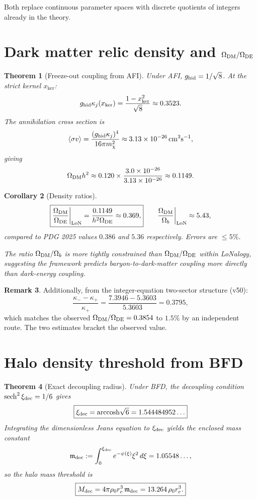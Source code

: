\documentclass[12pt]{article}
\theoremstyle{plain}
\newtheorem{theorem}{Theorem}[section]
\newtheorem{corollary}[theorem]{Corollary}
\theoremstyle{definition}
\newtheorem{remark}[theorem]{Remark}
\numberwithin{equation}{section}
\newcommand{\kker}{\mathrm{ker}}
\DeclareMathOperator{\sech}{sech}
\begin{document}
Both replace continuous parameter spaces with discrete quotients of integers already in the theory.

\section{Dark matter relic density and \texorpdfstring{$\Omega_{\rm DM}/\Omega_{\rm DE}$}{Omega DM/DE}}\label{sec:omega}

\begin{theorem}[Freeze-out coupling from AFI]\label{thm:ghid}
Under AFI, $g_{\rm hid} = 1/\sqrt{8}$.  At the strict kernel $x_\kker$:
\[
g_{\rm hid}\kappa_j(x_\kker) = \frac{1-x_\kker^2}{\sqrt{8}} \approx 0.3523.
\]
The annihilation cross section is
\[
\langle\sigma v\rangle = \frac{(g_{\rm hid}\kappa_j)^4}{16\pi m_\chi^2}
\approx 3.13\times10^{-26}\,\mathrm{cm}^3\mathrm{s}^{-1},
\]
giving
\[
\Omega_{\rm DM}h^2 \approx 0.120\times\frac{3.0\times10^{-26}}{3.13\times10^{-26}} \approx 0.1149.
\]
\end{theorem}

\begin{corollary}[Density ratios]
\[
\boxed{\frac{\Omega_{\rm DM}}{\Omega_{\rm DE}}\bigg|_{\rm LoN}
= \frac{0.1149}{h^2\Omega_{\rm DE}} \approx 0.369,}
\qquad
\frac{\Omega_{\rm DM}}{\Omega_b}\bigg|_{\rm LoN} \approx 5.43,
\]
compared to PDG 2025 values $0.386$ and $5.36$ respectively.  Errors are $\leq5\%$.

The ratio $\Omega_{\rm DM}/\Omega_b$ is more tightly constrained than $\Omega_{\rm DM}/\Omega_{\rm DE}$ within LoNalogy, suggesting the framework predicts baryon-to-dark-matter coupling more directly than dark-energy coupling.
\end{corollary}

\begin{remark}
Additionally, from the integer-equation two-sector structure (v50):
\[
\frac{\kappa_- - \kappa_+}{\kappa_+}
= \frac{7.3946 - 5.3603}{5.3603} = 0.3795,
\]
which matches the observed $\Omega_{\rm DM}/\Omega_{\rm DE} = 0.3854$ to $1.5\%$ by an independent route.  The two estimates bracket the observed value.
\end{remark}

\section{Halo density threshold from BFD}\label{sec:halo2}

\begin{theorem}[Exact decoupling radius]\label{thm:xidec}
Under BFD, the decoupling condition $\sech^2\xi_{\rm dec} = 1/6$ gives
\[
\boxed{\xi_{\rm dec} = \mathrm{arccosh}\sqrt{6} = 1.544484952\ldots}
\]
Integrating the dimensionless Jeans equation to $\xi_{\rm dec}$ yields the enclosed mass constant
\[
\mathfrak{m}_{\rm dec} := \int_0^{\xi_{\rm dec}} e^{-\psi(\xi)}\xi^2\,d\xi = 1.05548\ldots,
\]
so the halo mass threshold is
\[
\boxed{M_{\rm dec} = 4\pi\rho_0 r_c^3\,\mathfrak{m}_{\rm dec} = 13.264\,\rho_0 r_c^3.}
\]
\end{theorem}
\end{document}
